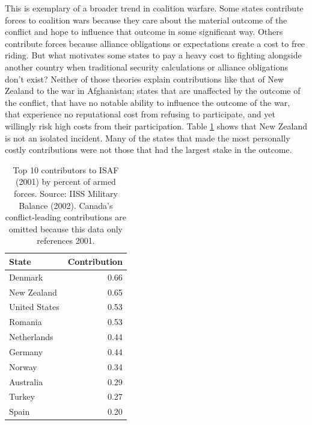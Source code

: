 \documentclass[12pt,letterpaper]{article}
\begin{document}
	This is exemplary of a broader trend in coalition warfare. Some states contribute forces to coalition wars because they care about the material outcome of the conflict and hope to influence that outcome in some significant way. Others contribute forces because alliance obligations or expectations create a cost to free riding. But what motivates some states to pay a heavy cost to fighting alongside another country when traditional security calculations or alliance obligations don't exist? Neither of those theories explain contributions like that of New Zealand to the war in Afghanistan; states that are unaffected by the outcome of the conflict, that have no notable ability to influence the outcome of the war, that experience no reputational cost from refusing to participate, and yet willingly risk high costs from their participation. Table \ref{table:2001_top} shows that New Zealand is not an isolated incident. Many of the states that made the most personally costly contributions were not those that had the largest stake in the outcome.

	\begin{table}[ht]
		\centering
		\begin{tabular}{|lr|}
			\hline
			\textbf{State} & \textbf{Contribution} \\
			\hline
			Denmark & 0.66 \\
			New Zealand & 0.65 \\
			United States & 0.53 \\
			Romania & 0.53 \\
			Netherlands & 0.44 \\
			Germany & 0.44 \\
			Norway & 0.34 \\
			Australia & 0.29 \\
			Turkey & 0.27 \\
			Spain & 0.20 \\
			\hline
		\end{tabular}
	\caption{Top 10 contributors to ISAF (2001) by percent of armed forces. Source: IISS Military Balance (2002). Canada's conflict-leading contributions are omitted because this data only references 2001.}
	\label{table:2001_top}
	\end{table}
\end{document}

